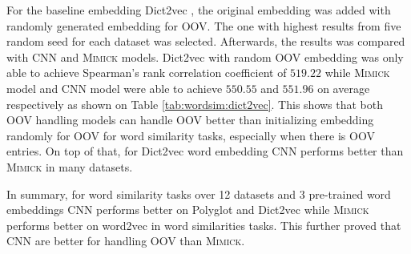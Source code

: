     For the baseline embedding Dict2vec \citep{dict2vect2017tissier},
    the original embedding was added with randomly generated embedding
    for OOV. The one with highest results from five random seed for
    each dataset was selected. Afterwards, the results was compared
    with CNN and \textsc{Mimick} models. Dict2vec with random OOV
    embedding was only able to achieve Spearman's rank correlation
    coefficient of $519.22$ while \textsc{Mimick} model and CNN model
    were able to achieve $550.55$ and $551.96$ on average respectively
    as shown on Table \ref{tab:wordsim:dict2vec}. This shows that both
    OOV handling models can handle OOV better than initializing
    embedding randomly for OOV for word similarity tasks, especially
    when there is OOV entries. On top of that, for Dict2vec word
    embedding CNN performs better than \textsc{Mimick} in many datasets.

    In summary, for word similarity tasks over 12 datasets and 3
    pre-trained word embeddings CNN performs better on Polyglot and
    Dict2vec while \textsc{Mimick} performs better on word2vec in word
    similarities tasks. This further proved that CNN are better for
    handling OOV than \textsc{Mimick}.